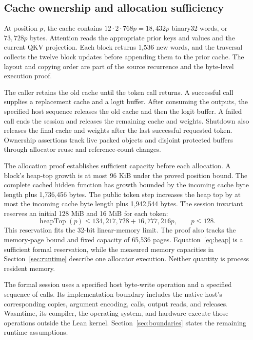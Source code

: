 \subsection{Cache ownership and allocation sufficiency}

At position $p$, the cache contains $12\cdot2\cdot768p=18{,}432p$ binary32 words, or $73{,}728p$ bytes.  Attention reads the appropriate prior keys and values and the current QKV projection.  Each block returns 1,536 new words, and the traversal collects the twelve block updates before appending them to the prior cache.  The layout and copying order are part of the source recurrence and the byte-level execution proof.

The caller retains the old cache until the token call returns.  A successful call supplies a replacement cache and a logit buffer.  After consuming the outputs, the specified host sequence releases the old cache and then the logit buffer.  A failed call ends the session and releases the remaining cache and weights.  Shutdown also releases the final cache and weights after the last successful requested token.  Ownership assertions track live packed objects and disjoint protected buffers through allocator reuse and reference-count changes.

The allocation proof establishes sufficient capacity before each allocation.  A block's heap-top growth is at most 96 KiB under the proved position bound.  The complete cached hidden function has growth bounded by the incoming cache byte length plus 1,736,456 bytes.  The public token step increases the heap top by at most the incoming cache byte length plus 1,942,544 bytes.  The session invariant reserves an initial 128 MiB and 16 MiB for each token:
\begin{equation}
 \operatorname{heapTop}(p)\leq134{,}217{,}728+16{,}777{,}216p,
 \qquad p\leq128.\label{eq:heap}
\end{equation}
This reservation fits the 32-bit linear-memory limit.  The proof also tracks the memory-page bound and fixed capacity of 65,536 pages.  Equation~\eqref{eq:heap} is a sufficient formal reservation, while the measured memory capacities in Section~\ref{sec:runtime} describe one allocator execution.  Neither quantity is process resident memory.

The formal session uses a specified host byte-write operation and a specified sequence of calls.  Its implementation boundary includes the native host's corresponding copies, argument encoding, calls, output reads, and releases.  Wasmtime, its compiler, the operating system, and hardware execute those operations outside the Lean kernel.  Section~\ref{sec:boundaries} states the remaining runtime assumptions.
